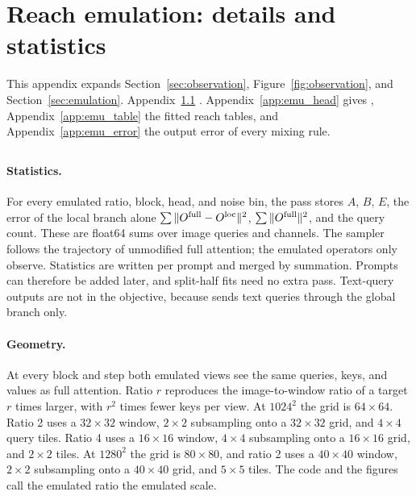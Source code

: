 \apxbarrier
\section{Reach emulation: details and statistics}
\label{app:emulation}

This appendix expands Section~\ref{sec:observation}, Figure~\ref{fig:observation}, and Section~\ref{sec:emulation}. Appendix~\ref{app:emu_record} . Appendix~\ref{app:emu_head} gives , Appendix~\ref{app:emu_table} the fitted reach tables, and Appendix~\ref{app:emu_error} the output error of every mixing rule.

\subsection{}
\label{app:emu_record}

\ifshortversion\else
\paragraph{Statistics.} For every emulated ratio, block, head, and noise bin, the pass stores $A$, $B$, $E$, the error of the local branch alone $\sum\|O^{\mathrm{full}}-O^{\mathrm{loc}}\|^2$, $\sum\|O^{\mathrm{full}}\|^2$, and the query count. These are float64 sums over image queries and channels. The sampler follows the trajectory of unmodified full attention; the emulated operators only observe. Statistics are written per prompt and merged by summation. Prompts can therefore be added later, and split-half fits need no extra pass. Text-query outputs are not in the objective, because \sca{} sends text queries through the global branch only.

\paragraph{Geometry.} At every block and step both emulated views see the same queries, keys, and values as full attention. Ratio $r$ reproduces the image-to-window ratio of a target $r$ times larger, with $r^2$ times fewer keys per view. At $1024^2$ the grid is $64\times64$. Ratio 2 uses a $32\times32$ window, $2\times2$ subsampling onto a $32\times32$ grid, and $4\times4$ query tiles. Ratio 4 uses a $16\times16$ window, $4\times4$ subsampling onto a $16\times16$ grid, and $2\times2$ tiles. At $1280^2$ the grid is $80\times80$, and ratio 2 uses a $40\times40$ window, $2\times2$ subsampling onto a $40\times40$ grid, and $5\times5$ tiles. The code and the figures call the emulated ratio the emulated scale.
\fi

